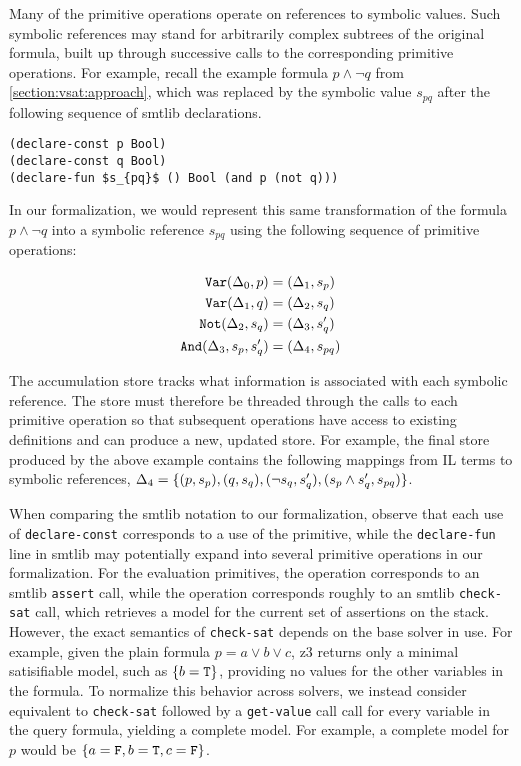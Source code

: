 Many of the primitive operations operate on references to symbolic values. Such
symbolic references may stand for arbitrarily complex subtrees of the original
formula, built up through successive calls to the corresponding primitive
operations.
%
For example, recall the example formula $p\wedge\neg q$ from
\autoref{section:vsat:approach}, which was replaced by the symbolic value $s_{pq}$ after
the following sequence of \acs{smtlib} declarations.
%
\begin{lstlisting}[columns=flexible,keepspaces=true,language=SMTLIB]
(declare-const p Bool)
(declare-const q Bool)
(declare-fun $s_{pq}$ () Bool (and p (not q)))
\end{lstlisting}
%
In our formalization, we would represent this same transformation of the
formula $p\wedge\neg q$ into a symbolic reference $s_{pq}$ using the
following sequence of primitive operations:

\vspace{-2ex}
{\footnotesize
\begin{align*}
\texttt{Var}(\Delta_{0}, p)       &= (\Delta_{1}, s_p) \\
\texttt{Var}(\Delta_{1}, q)       &= (\Delta_{2}, s_q) \\
\texttt{Not}(\Delta_{2}, s_q)       &= (\Delta_{3}, s_q') \\
\texttt{And}(\Delta_{3}, s_p, s_q') &= (\Delta_{4}, s_{pq})
\end{align*}}%

\noindent
%
The accumulation store tracks what information is associated with each symbolic
reference. The store must therefore be threaded through the calls to each
primitive operation so that subsequent operations have access to existing
definitions and can produce a new, updated store.
%
For example, the final store produced by the above example contains the
following mappings from IL terms to symbolic references,
$\aStore{4}=\set{(p,s_p),(q,s_q),(\neg s_q,s_q'),(s_p\wedge s_q',s_{pq})}$.


When comparing the \acl{smtlib} notation to our formalization, observe that
each use of \lstinline{declare-const} corresponds to a use of the \pspawn{}
primitive, while the \lstinline{declare-fun} line in \acs{smtlib} may
potentially expand into several primitive operations in our formalization.
%
For the evaluation primitives, the \passert{} operation corresponds to an
\acs{smtlib} \lstinline{assert} call, while the \pmodel{} operation corresponds
roughly to an \acs{smtlib} \lstinline{check-sat} call, which retrieves a model
for the current set of assertions on the stack.
%
However, the exact semantics of \lstinline{check-sat} depends on the base
solver in use. For example, given the plain formula $p = a \vee b \vee c$, z3
returns only a minimal satisifiable model, such as $\{b = \texttt{T}{}\}$, providing
no values for the other variables in the formula.
%
To normalize this behavior across solvers, we instead consider \pmodel{}
equivalent to \lstinline{check-sat} followed by a \lstinline{get-value} call
call for every variable in the query formula, yielding a complete model. For
example, a complete model for $p$ would be $\set{a=\fls{}, b=\tru{},
c=\fls{}}$.


